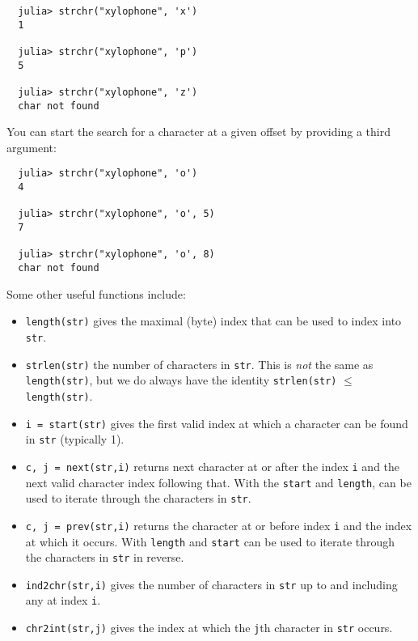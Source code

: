 \documentclass{article}
\begin{document}
\begin{verbatim}
  julia> strchr("xylophone", 'x')
  1

  julia> strchr("xylophone", 'p')
  5

  julia> strchr("xylophone", 'z')
  char not found
\end{verbatim}
You can start the search for a character at a given offset by providing a third argument:
\begin{verbatim}
  julia> strchr("xylophone", 'o')
  4

  julia> strchr("xylophone", 'o', 5)
  7

  julia> strchr("xylophone", 'o', 8)
  char not found
\end{verbatim}
Some other useful functions include:
\begin{itemize}
\item \verb|length(str)| gives the maximal (byte) index that can be used to index into \verb|str|.

\item \verb|strlen(str)| the number of characters in \verb|str|.
This is \emph{not} the same as \verb|length(str)|, but we do always have the identity \verb|strlen(str)| $\le$ \verb|length(str)|.

\item \verb|i = start(str)| gives the first valid index at which a character can be found in \verb|str| (typically 1).

\item \verb|c, j = next(str,i)| returns next character at or after the index \verb|i| and the next valid character index following that.
With the \verb|start| and \verb|length|, can be used to iterate through the characters in \verb|str|.


\item \verb|c, j = prev(str,i)| returns the character at or before index \verb|i| and the index at which it occurs.
With \verb|length| and \verb|start| can be used to iterate through the characters in \verb|str| in reverse.

\item \verb|ind2chr(str,i)| gives the number of characters in \verb|str| up to and including any at index \verb|i|.

\item \verb|chr2int(str,j)| gives the index at which the \verb|j|th character in \verb|str| occurs.
\end{itemize}
\end{document}
